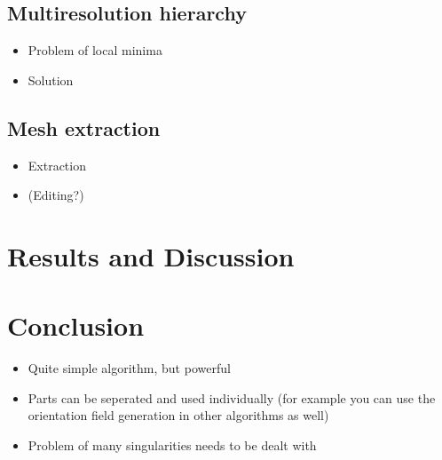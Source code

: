 \documentclass{ACGSeminar}
\begin{document}
\subsection{Multiresolution hierarchy}
\begin{itemize}
	\item	Problem of local minima
	\item	Solution
\end{itemize}

\subsection{Mesh extraction}
\cite{jakob2015instant}
\begin{itemize}
	\item	Extraction
	\item	(Editing?)
\end{itemize}

\section{Results and Discussion}


\section{Conclusion}
\begin{itemize}
	\item	Quite simple algorithm, but powerful
	\item	Parts can be seperated and used individually (for example you can use the orientation field generation in other algorithms as well)
	\item	Problem of many singularities needs to be dealt with
\end{itemize}

\label{cha:references}
\printbibliography
\end{document}

